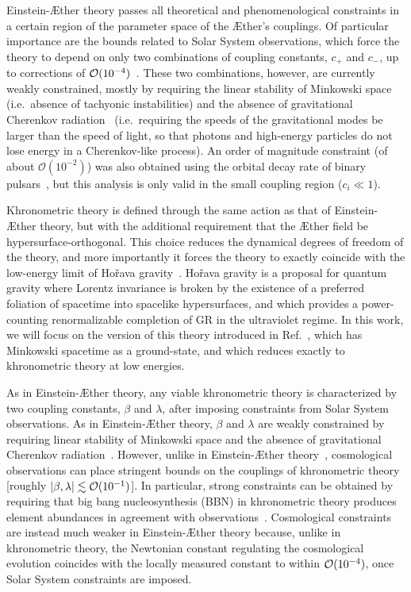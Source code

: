 \documentclass[prd,aps,twocolumn,nofootinbib,showpacs,superscriptaddress]{revtex4-1}
\begin{document}
Einstein-\AE ther theory passes all theoretical and phenomenological
constraints in a certain region of the parameter space of the \AE ther's couplings. Of particular
importance are the bounds related to Solar System observations, which
force the theory to depend on only two combinations of coupling
constants, $c_+$ and $c_-$, up to corrections
of ${\cal O}(10^{-4})$~\cite{will-living,Foster:2005dk}. These two combinations, however, are currently 
weakly constrained, mostly by requiring the linear stability of Minkowski space (i.e.~absence of tachyonic instabilities) 
and the absence of gravitational Cherenkov radiation~\cite{Elliott:2005va}
(i.e.~requiring the speeds of the gravitational modes be larger than the speed of light,
so that photons and high-energy particles do not lose energy in a Cherenkov-like process).
An order of magnitude constraint (of about $\mathcal{O}(10^{-2})$) was also obtained using the orbital decay rate of binary 
pulsars~\cite{Foster:2007gr}, but this analysis is only valid in the small coupling region ($c_{i} \ll 1$).

Khronometric theory is defined through the same action as that of Einstein-\AE ther theory, but with
the additional requirement that the \AE ther field be hypersurface-orthogonal.
 This choice reduces the dynamical degrees of freedom of the theory, and more importantly 
it forces the theory to exactly coincide with the low-energy limit of  Ho\v rava gravity~\cite{Horava:2009uw}.
Ho\v rava gravity is a proposal for quantum gravity where
Lorentz invariance is broken by the existence of a preferred foliation
of spacetime into spacelike hypersurfaces, and which provides a power-counting renormalizable
completion of GR in the ultraviolet regime.
In this work, we will focus on the version of this theory introduced
in Ref.~\cite{Blas:2009qj}, which has Minkowski spacetime as a
ground-state, and which reduces exactly to khronometric theory
at low energies.

As in Einstein-\AE ther theory, any viable khronometric theory is
characterized by two coupling constants, $\beta$ and $\lambda$, after imposing constraints  
from Solar System observations.
As in Einstein-\AE ther theory,  $\beta$ and $\lambda$ are weakly constrained by requiring linear
stability of Minkowski space and the absence of gravitational Cherenkov radiation~\cite{Blas:2010hb,Barausse:2011pu}. 
However, unlike in Einstein-\AE ther theory~\cite{Carroll:2004ai,Zuntz:2008zz,Li:2007vz,Jacobson:2008aj}, cosmological observations can place stringent bounds on the couplings of khronometric theory 
[roughly $|\beta, \lambda|\lesssim {\cal{O}}(10^{-1})$]. 
In particular, strong constraints can be obtained by requiring that big bang nucleosynthesis
(BBN) in khronometric theory produces element abundances in agreement with observations~\cite{Audren:2013dwa}.
Cosmological constraints are instead much weaker in Einstein-\AE ther theory 
because, unlike in khronometric theory, the Newtonian constant regulating the cosmological evolution
coincides with the locally measured constant to within ${\cal O}(10^{-4})$,
once Solar System constraints are imposed.
\end{document}
